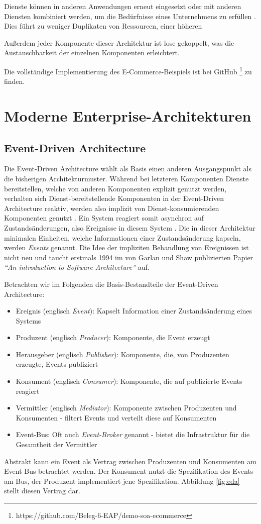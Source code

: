 \documentclass[acmtog]{acmart}
\begin{document}
Dienste können in anderen Anwendungen erneut eingesetzt oder
 mit anderen Diensten kombiniert werden, um die Bedürfnisse eines Unternehmens
 zu erfüllen \cite[29]{soa4}.
Dies führt zu weniger Duplikaten von Ressourcen, einer höheren

 Außerdem jeder Komponente dieser Architektur ist lose gekoppelt, was die
 Austauschbarkeit der einzelnen Komponenten erleichtert.

Die vollständige Implementierung des E-Commerce-Beispiels ist bei GitHub \footnote{https://github.com/Beleg-6-EAP/demo-soa-ecommerce} zu finden.
\section{Moderne Enterprise-Architekturen}

\subsection{Event-Driven Architecture}
Die Event-Driven Architecture wählt als Basis einen anderen Ausgangspunkt als die bisherigen Architekturmuster.
Während bei letzteren Komponenten Dienste bereitstellen, welche von anderen Komponenten explizit genutzt werden,
verhalten sich Dienst-bereitstellende Komponenten in der Event-Driven Architecture reaktiv,
werden also implizit von Dienst-konsumierenden Komponenten genutzt \cite{garlanShawImplizit}.
Ein System reagiert somit asynchron auf Zustandsänderungen, also Ereignisse in diesem System \cite{eda}.
Die in dieser Architektur minimalen Einheiten, welche Informationen einer Zustandsänderung kapseln, werden \textit{Events} genannt.
Die Idee der impliziten Behandlung von Ereignissen ist nicht neu und taucht erstmals 1994 im von Garlan und Shaw publizierten Papier
\textit{\enquote{An introduction to Software Architecture}} auf.

Betrachten wir im Folgenden die Basis-Bestandteile der Event-Driven Architecture:
\begin{itemize}
  \item Ereignis (englisch \textit{Event}): Kapselt Information einer Zustandsänderung eines Systems
  \item Produzent (englisch \textit{Producer}): Komponente, die Event erzeugt
  \item Herausgeber (englisch \textit{Publisher}): Komponente, die, von Produzenten erzeugte, Events publiziert
  \item Konsument (englisch \textit{Consumer}): Komponente, die auf publizierte Events reagiert
  \item Vermittler (englisch \textit{Mediator}): Komponente zwischen Produzenten und Konsumenten - filtert Events und verteilt diese auf Konsumenten
  \item Event-Bus: Oft auch \textit{Event-Broker} genannt - bietet die Infrastruktur für die Gesamtheit der Vermittler
\end{itemize}
Abstrakt kann ein Event als Vertrag zwischen Produzenten und Konsumenten am Event-Bus betrachtet werden.
Der Konsument nutzt die Spezifikation des Events am Bus, der Produzent implementiert jene Spezifikation.
Abbildung \ref{fig:eda} stellt diesen Vertrag dar.
\end{document}
